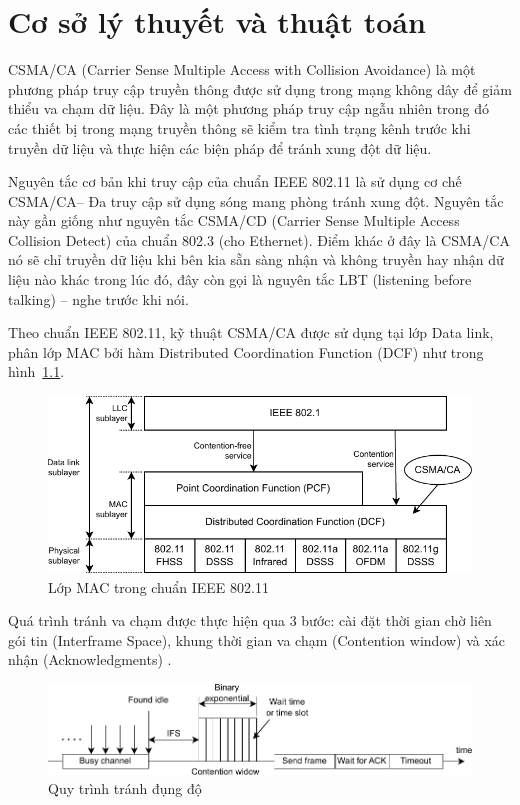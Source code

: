 \chapter{Cơ sở lý thuyết và thuật toán}
\label{ch::chapter2}

CSMA/CA (Carrier Sense Multiple Access with Collision Avoidance) là một phương pháp truy cập truyền 
thông được sử dụng trong mạng không dây để giảm thiểu va chạm dữ liệu. Đây là một phương pháp truy 
cập ngẫu nhiên trong đó các thiết bị trong mạng truyền thông sẽ kiểm tra tình trạng kênh trước khi 
truyền dữ liệu và thực hiện các biện pháp để tránh xung đột dữ liệu.

Nguyên tắc cơ bản khi truy cập của chuẩn IEEE 802.11 là sử dụng cơ chế CSMA/CA– Đa truy cập sử dụng sóng 
mang phòng tránh xung đột. Nguyên tắc này gần giống như nguyên tắc CSMA/CD (Carrier Sense Multiple 
Access Collision Detect) của chuẩn 802.3 (cho Ethernet). Điểm khác ở đây là CSMA/CA nó sẽ chỉ truyền 
dữ liệu khi bên kia sẵn sàng nhận và không truyền hay nhận dữ liệu nào khác trong lúc đó, đây còn gọi 
là nguyên tắc LBT (listening before talking) – nghe trước khi nói.

Theo chuẩn IEEE 802.11, kỹ thuật CSMA/CA được sử dụng tại lớp Data link, phân lớp MAC bởi hàm Distributed Coordination Function (DCF) như trong hình~\ref{fig:mac}.
\begin{figure}[h]
    \centering
    \includegraphics[width=0.85\linewidth]{figures/Chapter2/MAClayer_k2opt.pdf}
    \caption{Lớp MAC trong chuẩn IEEE 802.11}
    \label{fig:mac}
\end{figure}

Quá trình tránh va chạm được thực hiện qua 3 bước: cài đặt thời gian chờ liên gói tin (Interframe Space), khung thời gian
va chạm (Contention window) và xác nhận (Acknowledgments) \cite{nam}.

\begin{figure}[h]
    \centering
    \includegraphics[width=1.1\linewidth]{figures/Chapter2/Procedure_k2opt.pdf}
    \caption{Quy trình tránh đụng độ}
    \label{fig:procedure}
\end{figure}

